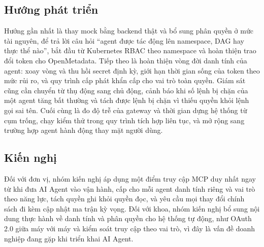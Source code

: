\subsection{Hướng phát triển}

Hướng gần nhất là thay mock bằng backend thật và bổ sung phân quyền ở mức tài nguyên, để trả lời câu hỏi ``agent được tác động lên namespace, DAG hay thực thể nào'', bắt đầu từ Kubernetes RBAC theo namespace và hoàn thiện trao đổi token cho OpenMetadata. Tiếp theo là hoàn thiện vòng đời danh tính của agent: xoay vòng và thu hồi secret định kỳ, giới hạn thời gian sống của token theo mức rủi ro, và quy trình cấp phát khẩn cấp cho vai trò toàn quyền. Giám sát cũng cần chuyển từ thụ động sang chủ động, cảnh báo khi số lệnh bị chặn của một agent tăng bất thường và tách được lệnh bị chặn vì thiếu quyền khỏi lệnh gọi sai tên. Cuối cùng là đo độ trễ của gateway và thời gian dựng hệ thống từ cụm trống, chạy kiểm thử trong quy trình tích hợp liên tục, và mở rộng sang trường hợp agent hành động thay mặt người dùng.

\subsection{Kiến nghị}

Đối với đơn vị, nhóm kiến nghị áp dụng một điểm truy cập MCP duy nhất ngay từ khi đưa AI Agent vào vận hành, cấp cho mỗi agent danh tính riêng và vai trò theo năng lực, tách quyền ghi khỏi quyền đọc, và yêu cầu mọi thay đổi chính sách đi kèm cập nhật ma trận kỳ vọng. Đối với khoa, nhóm kiến nghị bổ sung nội dung thực hành về danh tính và phân quyền cho hệ thống tự động, như OAuth 2.0 giữa máy với máy và kiểm soát truy cập theo vai trò, vì đây là vấn đề doanh nghiệp đang gặp khi triển khai AI Agent.
